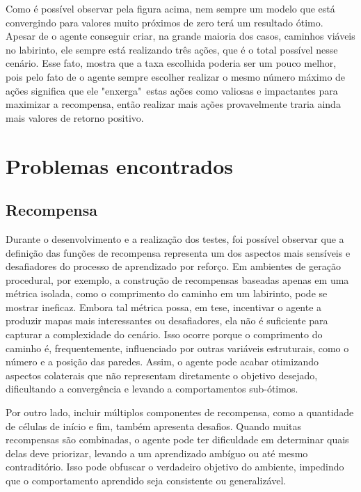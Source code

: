 \FloatBarrier
Como é possível observar pela figura acima, nem sempre um modelo que está convergindo para valores
muito próximos de zero terá um resultado ótimo. Apesar de o agente conseguir criar, na grande maioria dos casos, 
caminhos viáveis no labirinto, ele sempre está realizando três ações, que é o total possível nesse cenário. Esse fato,
mostra que a taxa escolhida poderia ser um pouco melhor, pois pelo fato de o agente sempre escolher realizar o mesmo
número máximo de ações significa que ele "enxerga"\ estas ações como valiosas e impactantes para maximizar a recompensa,
então realizar mais ações provavelmente traria ainda mais valores de retorno positivo.









\section{Problemas encontrados}

\subsection{Recompensa}
Durante o desenvolvimento e a realização dos testes, foi possível observar que a definição das funções de recompensa 
representa um dos aspectos mais sensíveis e desafiadores do processo de aprendizado por reforço. 
Em ambientes de geração procedural, por exemplo, a construção de recompensas baseadas apenas em uma métrica isolada, 
como o comprimento do caminho em um labirinto, pode se mostrar ineficaz. Embora tal métrica possa, em tese, 
incentivar o agente a produzir mapas mais interessantes ou desafiadores, ela não é suficiente para capturar 
a complexidade do cenário. Isso ocorre porque o comprimento do caminho é, frequentemente, influenciado por 
outras variáveis estruturais, como o número e a posição das paredes. Assim, o agente pode acabar otimizando 
aspectos colaterais que não representam diretamente o objetivo desejado, dificultando a convergência e levando 
a comportamentos sub-ótimos.

Por outro lado, incluir múltiplos componentes de recompensa, como a quantidade de células de início e fim, 
também apresenta desafios. Quando muitas recompensas são combinadas, o agente pode ter dificuldade em determinar 
quais delas deve priorizar, levando a um aprendizado ambíguo ou até mesmo contraditório. Isso pode 
obfuscar o verdadeiro objetivo do ambiente, impedindo que o comportamento aprendido seja consistente ou generalizável.

